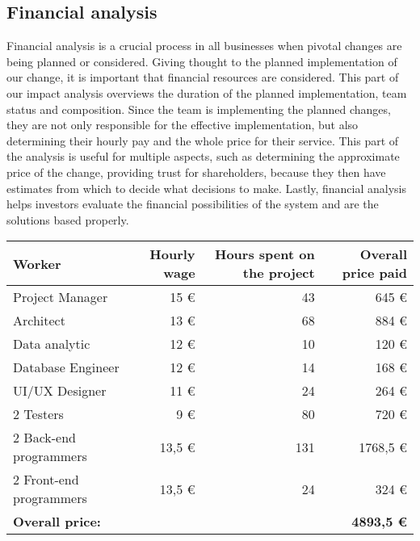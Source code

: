 \documentclass[11pt,a4paper]{article}
\begin{document}
\subsection{Financial analysis}
Financial analysis is a crucial process in all businesses when pivotal changes are being planned or considered. Giving thought to the planned implementation of our change, it is important that financial resources are considered. This part of our impact analysis overviews the duration of the planned implementation, team status and composition. Since the team is implementing the planned changes, they are not only responsible for the effective implementation, but also determining their hourly pay and the whole price for their service. This part of the analysis is useful for multiple aspects, such as determining the approximate price of the change, providing trust for shareholders, because they then have estimates from which to decide what decisions to make. Lastly, financial analysis helps investors evaluate the financial possibilities of the system and are the solutions based properly.
\newpage %
\begin{table}[h!]
    \centering
    \begin{tabular}{lrrr}
        \toprule
        Worker & Hourly wage & Hours spent on the project & Overall price paid \\
        \midrule
        Project Manager & 15 € & 43 & 645 € \\
        Architect & 13 € & 68 & 884 € \\
        Data analytic & 12 € & 10 & 120 € \\
        Database Engineer & 12 € & 14 & 168 € \\
        UI/UX Designer & 11 € & 24 & 264 € \\
        2 Testers & 9 € & 80 & 720 € \\
        2 Back-end programmers & 13,5 € & 131 & 1768,5 € \\
        2 Front-end programmers & 13,5 € & 24 & 324 € \\
        \midrule
        \textbf{Overall price:} & & & \textbf{4893,5 €} \\
        \bottomrule
    \end{tabular}
\end{table}

\begin{comment}
    kaip ir done????
\end{comment}
\end{document}
